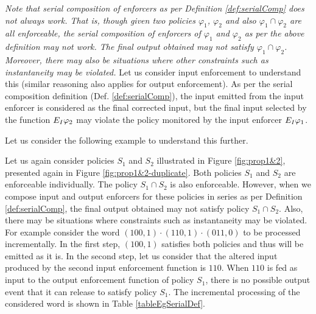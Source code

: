 {\begin{remark}
\end{remark}

\emph{Note that serial composition of enforcers as per Definition \ref{def:serialComp} does not always work. 
	That is, though given two policies $\varphi_1$, $\varphi_2$ and also $\varphi_1 \cap \varphi_2$ are all enforceable, the serial composition of enforcers of $\varphi_1$ and $\varphi_2$ as per the above definition may not work. The final output obtained may not satisfy $\varphi_1 \cap \varphi_2$. Moreover, there may also be situations where other constraints\blue{,} such as instantaneity\blue{,} may be violated.} Let us consider input enforcement to understand this (similar reasoning also applies for output enforcement). As per the serial composition definition (Def. \ref{def:serialComp}), the input emitted from the input enforcer  is considered as the final corrected input, but the final input selected by the function $E_{I}{\varphi_2}$  may violate the policy monitored by the input enforcer $E_{I}{\varphi_1}$.     

Let us consider the following example to understand this further.


\begin{example}
	Let us again consider policies $S_1$ and $S_2$ illustrated in Figure \ref{fig:prop1&2}, presented again in Figure \ref{fig:prop1&2-duplicate}. 
	Both policies $S_1$ and $S_2$ are enforceable individually. The policy $S_1 \cap S_2$ is also enforceable. 
	However, when we compose input and output enforcers for these policies in series as per Definition \ref{def:serialComp}, the final output obtained may not satisfy policy $S_1 \cap S_2$. 
	Also, there may be situations where constraints such as instantaneity may be violated. 
	For example\blue{,} consider the word $(100,1) \cdot (110,1) \cdot (011,0)$ to be processed incrementally.   
	In the first step, $(100,1)$ satisfies both policies and thus will be emitted as it is.
	In the second step, let us consider that the altered input produced by the second input enforcement function is $110$. 
	When $110$ is fed as input to the output enforcement function of policy $S_1$, there is no possible output event that it can release to satisfy policy $S_1$. The incremental processing of the considered word is shown in Table \ref{tableEgSerialDef}.	
\end{example}

}
